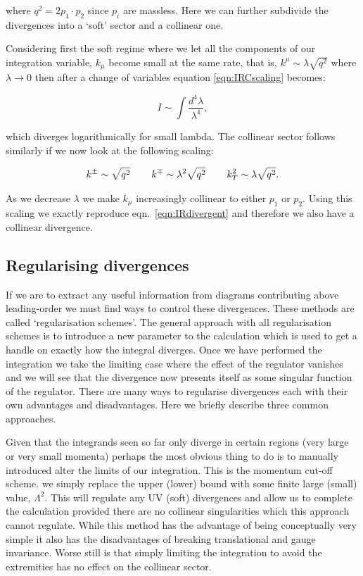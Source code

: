 		where $q^2=2p_1\cdot p_2$ since $p_i$ are massless.  Here we can further subdivide the divergences
		into a `soft' sector and a collinear one.

		Considering first the soft regime where we
		let all the components of our integration variable, $k_\mu$ become small at the same rate, that is,
		$k^\mu\sim\lambda\sqrt{q^2}$ where $\lambda\rightarrow0$ then after a change of variables equation
		\eqref{eqn:IRCscaling} becomes:

		\begin{equation}
			I \sim\int\frac{d^4\lambda}{\lambda^4},
			\label{eqn:IRdivergent}
		\end{equation}

		which diverges logarithmically for small lambda.  The collinear sector follows similarly if we now
		look at the following scaling:

		\begin{align}
			k^\pm\sim\sqrt{q^2}\hspace{0.75cm}k^\mp\sim\lambda^2\sqrt{q^2}\hspace{0.75cm}k_T^2\sim\lambda\sqrt{q^2}.
		\end{align}

		As we decrease $\lambda$ we make $k_\mu$ increasingly collinear to either $p_1$ or $p_2$.  Using
		this scaling we exactly reproduce eqn.~\eqref{eqn:IRdivergent} and therefore we also have a collinear divergence.

	\subsection{Regularising divergences}
		\label{sub:regularising}


		If we are to extract any useful information from diagrams contributing above leading-order we must find
		ways to control these divergences.  These methods are called `regularisation schemes'.  The
		general approach with all regularisation schemes is to introduce a new parameter to the calculation which
		is used to get a handle on exactly how the integral diverges.  Once we have performed the integration
		we take the limiting case where the effect of the regulator vanishes and we will see that the divergence now
		presents itself as some singular function of the regulator.  There are
		many ways to regularise divergences each with their own advantages and disadvantages.  Here we briefly describe
		three common approaches.

		Given that the integrands seen so far only diverge in certain regions (very large or very small momenta)
		perhaps the most obvious thing to do is to manually introduced alter the limits of our integration. This
		is the momentum cut-off scheme. we simply replace the upper (lower) bound with some finite large (small)
		value, $\Lambda^2$.  This will regulate any UV (soft) divergences and allow us to complete the calculation
		provided there are no collinear singularities which this approach cannot regulate.  While this
		method has the advantage of being conceptually very simple it also has the disadvantages of
		breaking translational and gauge invariance.  Worse still is that simply limiting the integration to
		avoid the extremities has no effect on the collinear sector.

